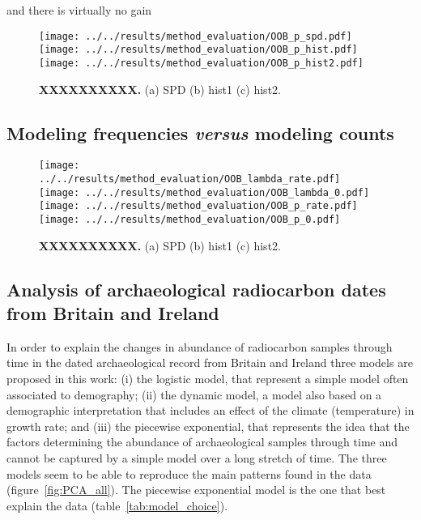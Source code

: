 \documentclass[a4paper]{article}
\begin{document}
and there is virtually no gain


\begin{figure}[tbh]
\center\texttt{[image: ../../results/method\_evaluation/OOB\_p\_spd.pdf]} \texttt{[image: ../../results/method\_evaluation/OOB\_p\_hist.pdf]} \texttt{[image: ../../results/method\_evaluation/OOB\_p\_hist2.pdf]}
\caption{\textbf{XXXXXXXXXX.} (a) SPD (b) hist1 (c) hist2.}
\label{fig:summary_stats}
\end{figure}



\subsection*{Modeling frequencies \emph{versus} modeling counts}

\begin{figure}[tbh]
\center\texttt{[image: ../../results/method\_evaluation/OOB\_lambda\_rate.pdf]} \texttt{[image: ../../results/method\_evaluation/OOB\_lambda\_0.pdf]} \texttt{[image: ../../results/method\_evaluation/OOB\_p\_rate.pdf]}
\texttt{[image: ../../results/method\_evaluation/OOB\_p\_0.pdf]}
\caption{\textbf{XXXXXXXXXX.} (a) SPD (b) hist1 (c) hist2.}
\label{fig:summary_stats}
\end{figure}


\subsection*{Analysis of archaeological radiocarbon dates from Britain and Ireland}


In order to explain the changes in abundance of radiocarbon samples through time in the dated archaeological record from Britain and Ireland three models are proposed in this work: (i) the logistic model, that represent a simple model often associated to demography; (ii) the dynamic model, a model also based on a demographic interpretation that includes an effect of the climate (temperature) in growth rate; and (iii) the piecewise exponential, that represents the idea that the factors determining the abundance of archaeological samples through time and cannot be captured by a simple model over a long stretch of time. The three models seem to be able to reproduce the main patterns found in the data (figure~\ref{fig:PCA_all}). The piecewise exponential model is the one that best explain the data (table~\ref{tab:model_choice}).
\\
\end{document}
